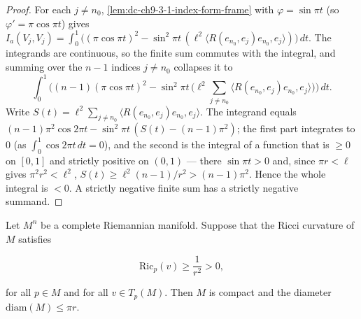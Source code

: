 \begin{proof}
  \leanok
  \sketch
  For each $j\ne n_0$, \cref{lem:dc-ch9-3-1-index-form-frame} with $\varphi=\sin\pi t$
  (so $\varphi'=\pi\cos\pi t$) gives
  $I_a(V_j,V_j)=\int_0^1\big((\pi\cos\pi t)^2-\sin^2\pi t\,(\ell^2\langle R(e_{n_0},e_j)e_{n_0},e_j\rangle)\big)\,dt$.
  The integrands are continuous, so the finite sum commutes with the integral, and summing over
  the $n-1$ indices $j\ne n_0$ collapses it to
  $$
  \int_0^1\Big((n-1)(\pi\cos\pi t)^2-\sin^2\pi t\,\big(\ell^2\textstyle\sum_{j\ne n_0}\langle R(e_{n_0},e_j)e_{n_0},e_j\rangle\big)\Big)\,dt.
  $$
  Write $S(t)=\ell^2\sum_{j\ne n_0}\langle R(e_{n_0},e_j)e_{n_0},e_j\rangle$. The integrand equals
  $(n-1)\pi^2\cos 2\pi t-\sin^2\pi t\,(S(t)-(n-1)\pi^2)$; the first part integrates to $0$
  (as $\int_0^1\cos 2\pi t\,dt=0$), and the second is the integral of a function that is $\ge 0$
  on $[0,1]$ and strictly positive on $(0,1)$ --- there $\sin\pi t>0$ and, since $\pi r<\ell$
  gives $\pi^2 r^2<\ell^2$, $S(t)\ge\ell^2(n-1)/r^2>(n-1)\pi^2$. Hence the whole integral is
  $<0$. A strictly negative finite sum has a strictly negative summand.
\end{proof}
\begin{theorem}
  \label{thm:dc-ch9-3-1}
  \notready
  \notready
  Let $M^n$ be a complete Riemannian manifold. Suppose that the Ricci curvature of
  $M$ satisfies

  $$
  \mathrm{Ric}_p(v)\ge\frac{1}{r^2}>0,
  $$

  for all $p\in M$ and for all $v\in T_p(M)$. Then $M$ is compact and the diameter
  $\mathrm{diam}(M)\le\pi r$.
\end{theorem}

